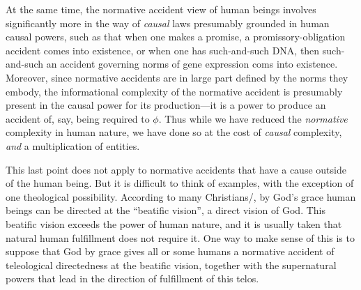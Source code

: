 At the same time, the normative accident view of human beings involves significantly more in the way of \textit{causal} laws
presumably grounded in human causal powers, such as that when one makes a promise, a promissory-obligation
accident comes into existence, or when one has such-and-such DNA, then such-and-such an accident governing norms of gene expression
coms into existence. Moreover, since normative accidents are in large part defined by the norms they embody, the informational
complexity of the normative accident is presumably present in the causal power for its production---it is a power to produce an
accident of, say, being required to $\phi$.  Thus while we have reduced the \textit{normative} complexity in human nature, we have done 
so at the cost of \textit{causal} complexity, \textit{and} a multiplication of entities.

This last point does not apply to normative accidents that have a cause outside of the human being. But it is difficult to think
of examples, with the exception of one theological possibility. According to many Christians/, by God's grace human beings
can be directed at the ``beatific vision'', a direct vision of God. This beatific vision exceeds the power of human
nature, and it is usually taken that natural human fulfillment does not require it. One way to make sense of this is to suppose
that God by grace gives all or some humans a normative accident of teleological directedness at the beatific vision, together
with the supernatural powers that lead in the direction of fulfillment of this telos. 

\chaptertail
